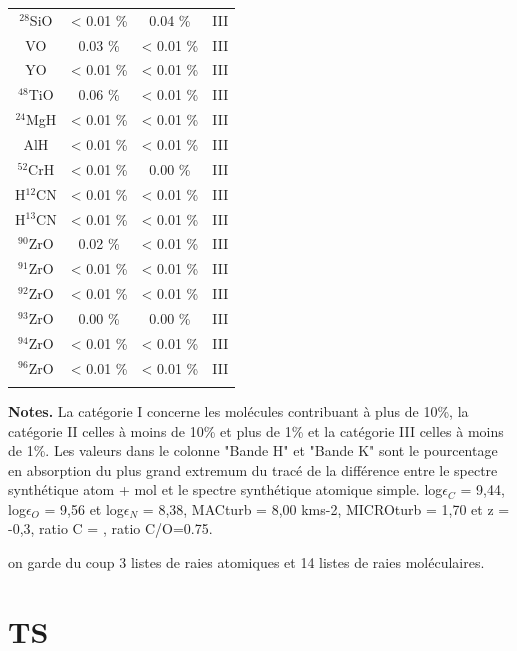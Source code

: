 \begin{table}[h!]
\begin{minipage}[t]{.4\linewidth}
\begin{center}
\begin{tabular}{cccc}
        $^{28}$SiO & < 0.01 \% & 0.04 \% & III\\
		VO &  0.03 \% &  < 0.01 \% & III\\
		YO & < 0.01 \% &  < 0.01 \%& III\\
		$^{48}$TiO &  0.06 \% &  < 0.01 \% & III\\
		$^{24}$MgH &  < 0.01 \% &  < 0.01 \% & III \\
		AlH &  < 0.01 \% &  < 0.01 \% & III \\
		$^{52}$CrH & < 0.01 \% & 0.00 \% & III\\
		H$^{12}$CN & < 0.01 \% & < 0.01 \% & III\\
		H$^{13}$CN &   < 0.01 \% & < 0.01 \% & III\\
		$^{90}$ZrO & 0.02  \% & < 0.01  \% & III\\
		$^{91}$ZrO &  < 0.01 \% &  < 0.01 \% & III\\
		$^{92}$ZrO & < 0.01 \% &  < 0.01 \% & III\\
		$^{93}$ZrO &  0.00 \% & 0.00 \% & III\\
		$^{94}$ZrO &  < 0.01 \% &  < 0.01 \% & III\\
		$^{96}$ZrO &  < 0.01 \% &  < 0.01 \% & III\\
		 &  &  \\
        \hline
    \end{tabular}
	\end{center}
\end{minipage}
\vspace{0.3cm}

\textbf{Notes.} La catégorie I concerne les molécules contribuant à plus de 10\%, la catégorie II celles à moins de 10\% et plus de 1\% et la catégorie III celles à moins de 1\%. Les valeurs dans le colonne "Bande H" et "Bande K" sont le pourcentage en absorption du plus grand extremum du tracé de la différence entre le spectre synthétique atom + mol et le spectre synthétique atomique simple. log$\epsilon_C$ = 9,44, log$\epsilon_O$ = 9,56 et log$\epsilon_N$ = 8,38, MACturb = 8,00 kms-2, MICROturb = 1,70 et z = -0,3, ratio C = , ratio C/O=0.75.
\label{contribution_mol}
\end{table}

on garde du coup 3 listes de raies atomiques et 14 listes de raies moléculaires.

\section{\sc TS}

